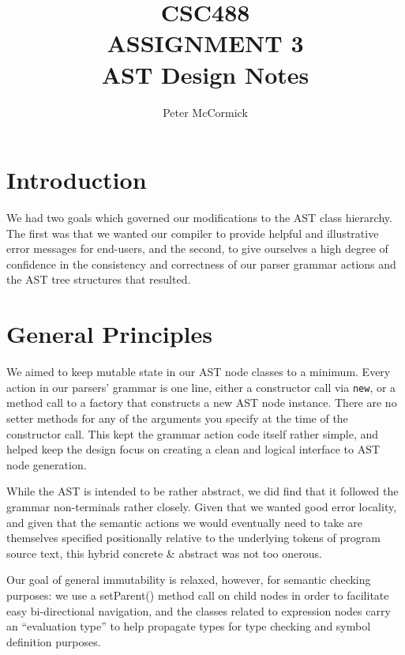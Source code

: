 \documentclass[oneside]{amsart}
\theoremstyle{definition}
\theoremstyle{remark}
\numberwithin{equation}{section}
\begin{document}
\title[CSC488 A3]{CSC488\\ASSIGNMENT 3\\AST Design Notes}
\author{Peter McCormick}

\begin{titlepage}
\maketitle
\thispagestyle{empty}
\tableofcontents
\end{titlepage}

\section{Introduction}
We had two goals which governed our modifications to the AST class hierarchy.
The first was that we wanted our compiler to provide helpful and illustrative
error messages for end-users, and the second, to give ourselves a high degree
of confidence in the consistency and correctness of our parser grammar actions
and the AST tree structures that resulted.

\section{General Principles}
We aimed to keep mutable state in our AST node classes to a minimum. Every
action in our parsers' grammar is one line, either a constructor call via
\texttt{new}, or a method call to a factory that constructs a new AST node
instance. There are no setter methods for any of the arguments you specify at
the time of the constructor call. This kept the grammar action code itself
rather simple, and helped keep the design focus on creating a clean and logical
interface to AST node generation.

While the AST is intended to be rather abstract, we did find that it followed
the grammar non-terminals rather closely. Given that we wanted good error
locality, and given that the semantic actions we would eventually need to take
are themselves specified positionally relative to the underlying tokens of
program source text, this hybrid concrete \& abstract was not too onerous.

Our goal of general immutability is relaxed, however, for semantic checking
purposes: we use a setParent() method call on child nodes in order to
facilitate easy bi-directional navigation, and the classes related to
expression nodes carry an ``evaluation type'' to help propagate types for type
checking and symbol definition purposes.
\end{document}
